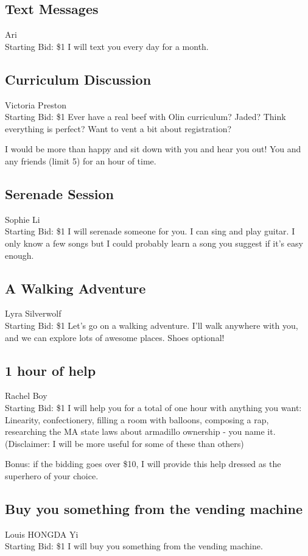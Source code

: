 \documentclass[11pt]{article}
\begin{document}
\subsection{Text Messages}
Ari
\\
Starting Bid: \$1
\newline
I will text you every day for a month.
\subsection{Curriculum Discussion}
Victoria Preston
\\
Starting Bid: \$1
\newline
Ever have a real beef with Olin curriculum?  Jaded?  Think everything is perfect?  Want to vent a bit about registration?  

I would be more than happy and sit down with you and hear you out!  You and any friends (limit 5) for an hour of time.
\subsection{Serenade Session}
Sophie Li
\\
Starting Bid: \$1
\newline
I will serenade someone for you. I can sing and play guitar. I only know a few songs but I could probably learn a song you suggest if it's easy enough.
\subsection{A Walking Adventure}
Lyra Silverwolf
\\
Starting Bid: \$1
\newline
Let's go on a walking adventure. I'll walk anywhere with you, and we can explore lots of awesome places. Shoes optional!
\subsection{1 hour of help}
Rachel Boy
\\
Starting Bid: \$1
\newline
I will help you for a total of one hour with anything you want: Linearity, confectionery, filling a room with balloons, composing a rap, researching the MA state laws about armadillo ownership - you name it. (Disclaimer: I will be more useful for some of these than others)

Bonus: if the bidding goes over \$10, I will provide this help dressed as the superhero of your choice.
\subsection{Buy you something from the vending machine}
Louis HONGDA Yi
\\
Starting Bid: \$1
\newline
I will buy you something from the vending machine.
\end{document}
